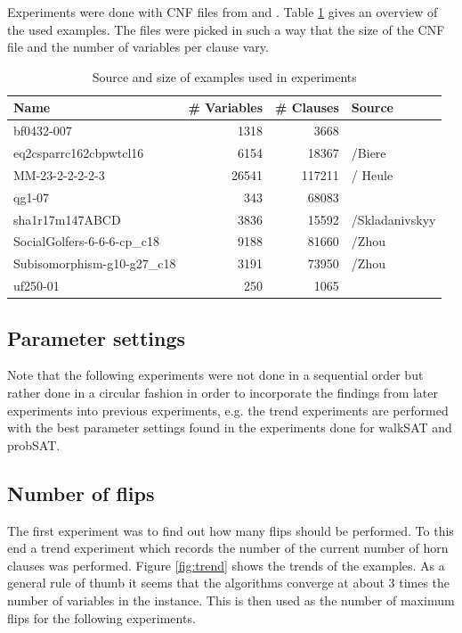 \documentclass[12pt,a4paper]{article}
\begin{document}
Experiments were done with CNF files from \cite{sat_race_2019} and \cite{satlib_benchmark}. Table \ref{tab:ex} gives an overview of the used examples. The files were picked in such a way that the size of the CNF file and the number of variables per clause vary.
\begin{table}[h]
  \begin{tabular}{lrrl}
    Name & \# Variables & \# Clauses & Source\\
    \hline
    bf0432-007 & 1318 & 3668 & \cite{satlib_benchmark}\\
    eq2csparrc162cbpwtcl16 & 6154 & 18367 & \cite{sat_race_2019}/Biere\\
    MM-23-2-2-2-2-3 & 26541 & 117211 & \cite{sat_race_2019}/ Heule\\
    qg1-07 & 343 & 68083 & \cite{satlib_benchmark}\\
    sha1r17m147ABCD & 3836 & 15592 & \cite{sat_race_2019}/Skladanivskyy \\
    SocialGolfers-6-6-6-cp\_c18 & 9188 & 81660 & \cite{sat_race_2019}/Zhou\\
    Subisomorphism-g10-g27\_c18 & 3191 & 73950 & \cite{sat_race_2019}/Zhou \\
    uf250-01 & 250 & 1065 & \cite{satlib_benchmark} 
  \end{tabular}
  \caption{Source and size of examples used in experiments}
  \label{tab:ex}
\end{table}
\subsection{Parameter settings}
Note that the following experiments were not done in a sequential order but rather done in a circular fashion in order to incorporate the findings from later experiments into previous experiments, e.g. the trend experiments are performed with the best parameter settings found in the experiments done for walkSAT and probSAT.
\subsection{Number of flips}
The first experiment was to find out how many flips should be performed. To this end a trend experiment which records the number of the current number of horn clauses was performed. Figure \ref{fig:trend} shows the trends of the examples. As a general rule of thumb it seems that the algorithms converge at about 3 times the number of variables in the instance. This is then used as the number of maximum flips for the following experiments.\\
\end{document}
